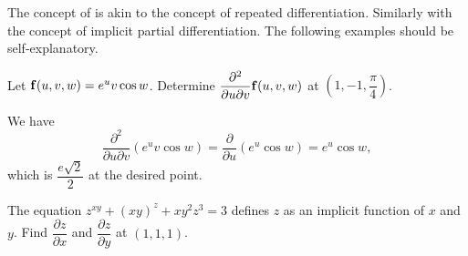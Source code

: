 The concept of  is akin to the
concept of repeated differentiation. Similarly with the concept of
implicit partial differentiation. The following examples should be
self-explanatory.

\begin{exa}
Let $\mathbf{ f}(u, v, w) = e^uv\cos w$. Determine $\dfrac{\partial ^2
}{\partial u \partial v} \mathbf{ f}(u, v, w)$ at
$(1,-1,\dfrac{\pi}{4})$.\end{exa}
\begin{solu}
We have $$\dfrac{\partial ^2 }{\partial u \partial v} (e^uv\cos w) =
\dfrac{\partial}{\partial u } (e^u\cos w) = e^u\cos w,
$$which is $\dfrac{e\sqrt{2}}{2}$ at the desired point.
\end{solu}
\begin{exa} The equation $z^{xy} + (xy)^z + xy^2z^3 =3$ defines $z$ as an
implicit function of $x$ and $y$. Find $\dfrac{\partial z}{\partial
x}$ and $\dfrac{\partial z}{\partial y}$ at $(1,1,1)$. \end{exa}
